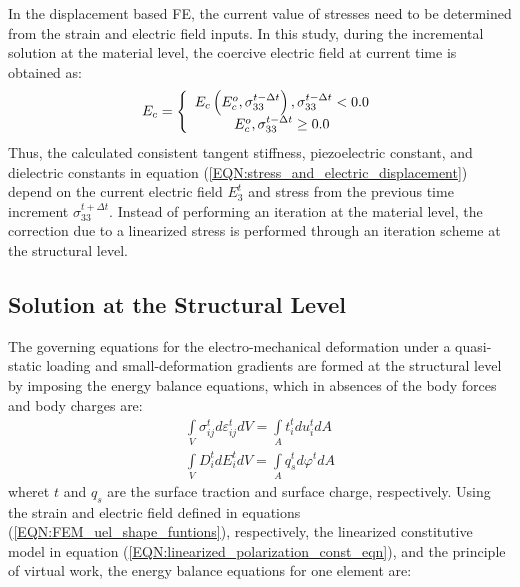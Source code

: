 In the displacement based FE, the current value of stresses need to be determined from the strain and electric field inputs. 
In this study, during the incremental solution at the material level, the coercive electric field at current time is obtained as:
\begin{equation}  
{E_c} = \left\{ {\begin{array}{*{20}{c}}
{{E_c}\left( {E_c^o,\sigma _{33}^{t - \Delta t}} \right),{\rm{  }}\sigma _{33}^{t - \Delta t} < 0.0}\\
{E_c^o,{\rm{                   }}\sigma _{33}^{t - \Delta t} \ge 0.0}
\end{array}} \right.
\label{EQN:coercive_field}
\end{equation}
Thus, the calculated consistent tangent stiffness, piezoelectric constant, and dielectric constants in equation (\ref{EQN:stress_and_electric_displacement}) depend on the current electric field $E^t_3$ and stress from the previous time increment $\sigma^{t+\Delta t}_{33}$. 
Instead of performing an iteration at the material level, the correction due to a linearized stress is performed through an iteration scheme at the structural level.


\subsection{Solution at the Structural Level}
The governing equations for the electro-mechanical deformation under a quasi-static loading and small-deformation gradients are formed at the structural level by imposing the energy balance equations, which in absences of the body forces and body charges are:
\begin{equation}  
\begin{array}{l}
\int\limits_V {\sigma _{ij}^td\varepsilon _{ij}^tdV}  = \int\limits_A {t_i^tdu_i^tdA} \\
\int\limits_V {D_i^tdE_i^tdV}  = \int\limits_A {q_s^td\varphi _{}^tdA} 
\end{array}
\label{EQN:integration}
\end{equation}
wheret $t$ and $q_s$ are the surface traction and surface charge, respectively. 
Using the strain and electric field defined in equations (\ref{EQN:FEM_uel_shape_funtions}), respectively, the linearized constitutive model in equation (\ref{EQN:linearized_polarization_const_eqn}),
 and the principle of virtual work, the energy balance equations for one element are:

